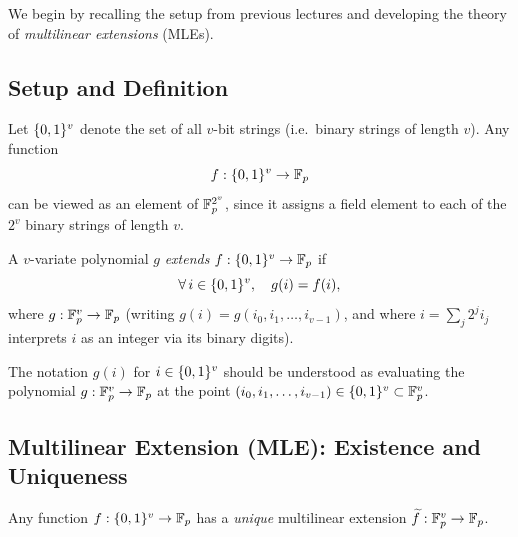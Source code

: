 \documentclass[11pt]{article}
\begin{document}
We begin by recalling the setup from previous lectures and developing the theory of
\emph{multilinear extensions} (MLEs).

\subsection{Setup and Definition}

\begin{tcolorbox}[colback=blue!5!white, colframe=blue!50!black, title=Setup]
Let $\{0,1\}^v$ denote the set of all $v$-bit strings (i.e.\ binary strings of length $v$).
Any function
\[
  f : \{0,1\}^v \to \mathbb{F}_p
\]
can be viewed as an element of $\mathbb{F}_p^{2^v}$, since it assigns a field element to
each of the $2^v$ binary strings of length $v$.
\end{tcolorbox}

\begin{definition}
A $v$-variate polynomial $g$ \emph{extends} $f : \{0,1\}^v \to \mathbb{F}_p$ if
\[
  \forall\, i \in \{0,1\}^v, \quad g(i) = f(i),
\]
where $g : \mathbb{F}_p^v \to \mathbb{F}_p$ (writing $g(i) = g(i_0, i_1, \ldots, i_{v-1})$,
and where $i = \sum_j 2^j i_j$ interprets $i$ as an integer via its binary digits).
\end{definition}

\begin{remark}
The notation $g(i)$ for $i \in \{0,1\}^v$ should be understood as evaluating the polynomial
$g : \mathbb{F}_p^v \to \mathbb{F}_p$ at the point $(i_0, i_1, \ldots, i_{v-1}) \in \{0,1\}^v
\subset \mathbb{F}_p^v$.
\end{remark}

\subsection{Multilinear Extension (MLE): Existence and Uniqueness}

\begin{tcolorbox}[colback=green!5!white, colframe=green!50!black, title=Key Theorem (MLE)]
\begin{theorem}
\label{thm:mle}
Any function $f : \{0,1\}^v \to \mathbb{F}_p$ has a \emph{unique} multilinear extension
$\widetilde{f} : \mathbb{F}_p^v \to \mathbb{F}_p$.
\end{theorem}
\end{tcolorbox}
\end{document}
